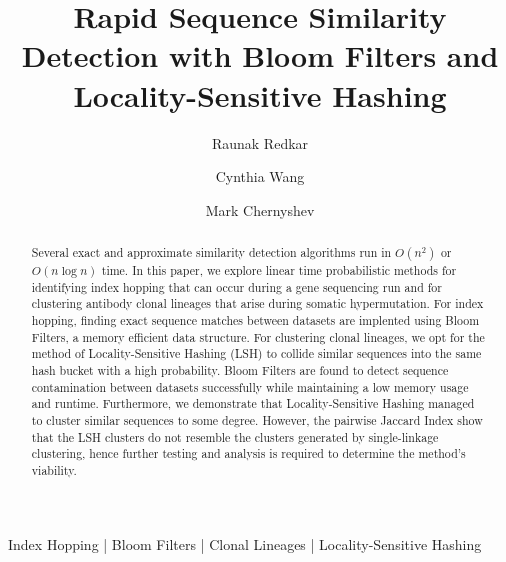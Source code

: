 \documentclass[times, twoside, watermark]{zHenriquesLab-StyleBioRxiv}
\begin{document}
\title{Rapid Sequence Similarity Detection with Bloom Filters and Locality-Sensitive Hashing}

\author[1, 2 ]{Raunak Redkar }
\author[1, 2, 3 ]{Cynthia Wang } 
\author[2, 4 ]{Mark Chernyshev }





\maketitle

\begin{abstract}
Several exact and approximate similarity detection algorithms run in $O(n^2)$ or $O(n\log n)$ time. In this paper, we explore linear time probabilistic methods for identifying index hopping that can occur during a gene sequencing run and for clustering antibody clonal lineages that arise during somatic hypermutation. For index hopping, finding exact sequence matches between datasets are implented using Bloom Filters, a memory efficient data structure. For clustering clonal lineages, we opt for the method of Locality-Sensitive Hashing (LSH) to collide similar sequences into the same hash bucket with a high probability. Bloom Filters are found to detect sequence contamination between datasets successfully while maintaining a low memory usage and runtime. Furthermore, we demonstrate that Locality-Sensitive Hashing managed to cluster similar sequences to some degree. However, the pairwise Jaccard Index show that the LSH clusters do not resemble the clusters generated by single-linkage clustering, hence further testing and analysis is required to determine the method's viability. 
\end{abstract}

\begin{keywords}
Index Hopping | Bloom Filters | Clonal Lineages | Locality-Sensitive Hashing 
\end{keywords}
\end{document}
